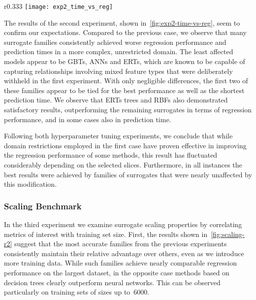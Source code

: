 \begin{wrapfigure}{r}{0.333\textwidth}
	\centering
	\texttt{[image: exp2\_time\_vs\_reg]}
	\caption{Results of experiment~2, plotted analogously
	to~\cref{fig:exp1-time-vs-reg}.}
	\label{fig:exp2-time-vs-reg}
\end{wrapfigure}

The results of the second experiment, shown in~\cref{fig:exp2-time-vs-reg},
seem to confirm our expectations. Compared to the previous case, we observe
that many surrogate families consistently achieved worse regression
performance and prediction times in a more complex, unrestricted domain. The least
affected models appear to be GBTs, ANNs and ERTs, which are known to be capable of capturing relationships
involving mixed feature types that were deliberately withheld in the first
experiment. With only negligible differences, the first two of these families
appear to be tied for the best performance as well as the shortest prediction
time. We observe that ERTs trees and RBFs also
demonstrated satisfactory results, outperforming the remaining surrogates in
terms of regression performance, and in some cases also in prediction time.

Following both hyperparameter tuning experiments, we conclude that while domain
restrictions employed in the first case have proven effective in improving the
regression performance of some methods, this result has fluctuated considerably
depending on the selected slices. Furthermore, in all instances the best
results were achieved by families of surrogates that were nearly unaffected by
this modification.


\subsubsection{Scaling Benchmark}

In the third experiment we examine surrogate scaling properties by correlating
metrics of interest with training set size. First, the results shown 
in~\cref{fig:scaling-r2} suggest that the most accurate families from the previous experiments
consistently maintain their relative advantage over others, even as we introduce
more training data. While such families achieve nearly comparable regression
performance on the largest dataset, in the opposite case methods based on
decision trees clearly outperform neural networks. This can be observed
particularly on training sets of sizes up to~\num{6000}.

